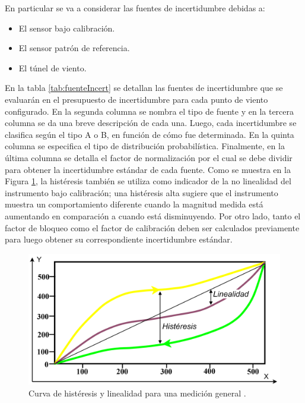 En particular se va a considerar las fuentes de incertidumbre debidas a:
\begin{itemize}
    \item El sensor bajo calibración.
    \item El sensor patrón de referencia.
    \item El túnel de viento.
\end{itemize}

En la tabla \ref{tab:fuenteIncert} se detallan las fuentes de incertidumbre que se evaluarán en el presupuesto de incertidumbre para cada punto de viento configurado. En la segunda columna se nombra el tipo de fuente y en la tercera columna se da una breve descripción de cada una. Luego, cada incertidumbre se clasifica según el tipo A o B, en función de cómo fue determinada. En la quinta columna se especifica el tipo de distribución probabilística. Finalmente, en la última columna se detalla el factor de normalización por el cual se debe dividir para obtener la incertidumbre estándar de cada fuente. Como se muestra en la Figura \ref{fig:histeresis}, la histéresis también se utiliza como indicador de la no linealidad del instrumento bajo calibración; una histéresis alta sugiere que el instrumento muestra un comportamiento diferente cuando la magnitud medida está aumentando en comparación a cuando está disminuyendo. Por otro lado, tanto el factor de bloqueo como el factor de calibración deben ser calculados previamente para luego obtener su correspondiente incertidumbre estándar.
\begin{figure}[H]
    \centering
    \includegraphics[width=0.85\linewidth]{Figuras/calculoIncertidumbre/histeresis.png}
    \caption{Curva de histéresis y linealidad para una medición general \cite{Workshop_WMO2021}.}
    \label{fig:histeresis}
\end{figure}


